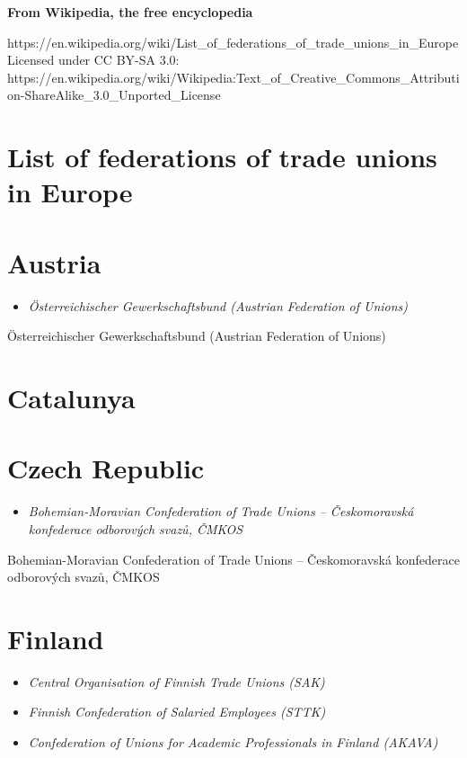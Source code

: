 \textbf{From Wikipedia, the free encyclopedia}

https://en.wikipedia.org/wiki/List\_of\_federations\_of\_trade\_unions\_in\_Europe\\
Licensed under CC BY-SA 3.0:\\
https://en.wikipedia.org/wiki/Wikipedia:Text\_of\_Creative\_Commons\_Attribution-ShareAlike\_3.0\_Unported\_License

\section{List of federations of trade unions in
Europe}\label{list-of-federations-of-trade-unions-in-europe}

\section{Austria}\label{austria}

\begin{itemize}
\item
  \emph{Österreichischer Gewerkschaftsbund (Austrian Federation of
  Unions)}
\end{itemize}

Österreichischer Gewerkschaftsbund (Austrian Federation of Unions)

\section{Catalunya}\label{catalunya}

\section{Czech Republic}\label{czech-republic}

\begin{itemize}
\item
  \emph{Bohemian-Moravian Confederation of Trade Unions -- Českomoravská
  konfederace odborových svazů, ČMKOS}
\end{itemize}

Bohemian-Moravian Confederation of Trade Unions -- Českomoravská
konfederace odborových svazů, ČMKOS

\section{Finland}\label{finland}

\begin{itemize}
\item
  \emph{Central Organisation of Finnish Trade Unions (SAK)}
\item
  \emph{Finnish Confederation of Salaried Employees (STTK)}
\item
  \emph{Confederation of Unions for Academic Professionals in Finland
  (AKAVA)}
\end{itemize}

